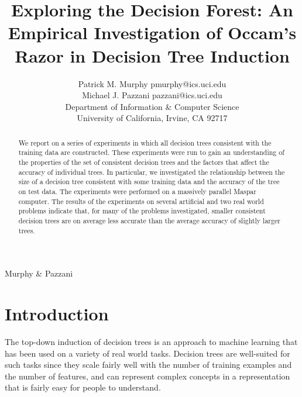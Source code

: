 
%
{Murphy \& Pazzani}




\title{Exploring the Decision Forest:
       An Empirical Investigation of Occam's Razor in Decision Tree Induction}

\author{\name Patrick M. Murphy \email pmurphy@ics.uci.edu \\
       \name Michael J. Pazzani \email pazzani@ics.uci.edu \\
       \addr Department of Information \& Computer Science \\
       University of California, Irvine, CA  92717}

\maketitle

\begin{abstract}
We report on a series of experiments in which all decision trees
consistent with the training data are constructed. These experiments
were run to gain an understanding of the properties of the set of
consistent decision trees and the factors that affect the accuracy of
individual trees. In particular, we investigated the relationship
between the size of a decision tree consistent with some training data
and the accuracy of the tree on test data. The experiments were
performed on a massively parallel Maspar computer.  The
results of the experiments on several artificial and two real
world problems indicate that, for many of the problems investigated,
smaller consistent decision trees are on average less accurate than
the average accuracy of slightly larger trees.
\end{abstract}

\section{Introduction}

The top-down induction of decision trees is an approach to machine
learning that has been used on a variety of real world tasks.
Decision trees are well-suited for such tasks since they scale fairly
well with the number of training examples and the number of features,
and can represent complex concepts in a representation that is fairly
easy for people to understand.


